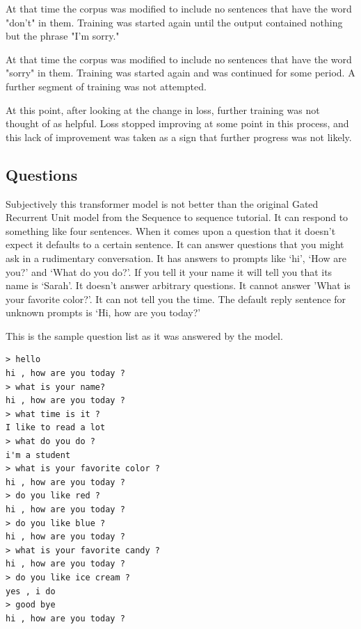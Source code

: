 At that time the corpus was modified to include no 
sentences that have the word "don't" in them. Training was started again until the output contained nothing but the phrase "I'm sorry." 

At that time the corpus was modified to include no sentences that have the word "sorry" in them. Training was started again and was continued for some period. A further segment of training was not attempted. 

At this point, after looking at the change in loss, further training was not thought of as helpful. Loss stopped improving at some point in this process, and this lack of improvement was taken as a sign that further progress was not likely.


\subsection*{Questions}
Subjectively this transformer model is not better than the original Gated Recurrent Unit model from the Sequence to sequence tutorial. It can respond to something like four sentences. When it comes upon a question that it doesn't expect it defaults to a certain sentence. It can answer questions that you might ask in a rudimentary conversation. It has answers to prompts like `hi', `How are you?' and `What do you do?'. If you tell it your name it will tell you that its name is `Sarah'. It doesn't answer arbitrary questions. It cannot answer 'What is your favorite color?'. It can not tell you the time. The default reply sentence for unknown prompts is `Hi, how are you today?'

This is the sample question list as it was answered by the model.

\begin{verbatim}
> hello
hi , how are you today ?
> what is your name?
hi , how are you today ?
> what time is it ?
I like to read a lot
> what do you do ?
i'm a student
> what is your favorite color ?
hi , how are you today ?
> do you like red ?
hi , how are you today ?
> do you like blue ?
hi , how are you today ?
> what is your favorite candy ?
hi , how are you today ?
> do you like ice cream ?
yes , i do 
> good bye
hi , how are you today ?
\end{verbatim}

